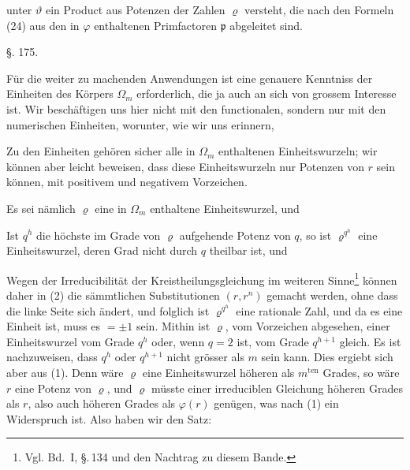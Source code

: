 unter $\vartheta$ ein Product aus Potenzen der Zahlen $\varrho$ versteht, die
nach den Formeln (24) aus den in $\varphi$ enthaltenen Primfactoren $\mathfrak{p}$
abgeleitet sind.

\begin{center}
§. 175.

\end{center}

Für die weiter zu machenden Anwendungen ist eine genauere
Kenntniss der Einheiten des Körpers $\Omega_m$ erforderlich, die ja
auch an sich von grossem Interesse ist. Wir beschäftigen uns
hier nicht mit den functionalen, sondern nur mit den numerischen
Einheiten, worunter, wie wir uns erinnern, 

Zu den Einheiten gehören sicher alle in $\Omega_m$ enthaltenen
Einheitswurzeln; wir können aber leicht beweisen, dass diese
Einheitswurzeln nur Potenzen von $r$ sein können, mit positivem
und negativem Vorzeichen.

Es sei nämlich $\varrho$ eine in $\Omega_m$ enthaltene Einheitswurzel, und

Ist $q^h$ die höchste im Grade von $\varrho$ aufgehende Potenz von $q$,
so ist $\varrho^{q^h}$ eine Einheitswurzel, deren Grad nicht durch $q$ theilbar
ist, und

Wegen der Irreducibilität der Kreistheilungsgleichung im
weiteren Sinne\footnote{Vgl. Bd.~I, §.\,134 und den Nachtrag zu diesem Bande.} können daher in (2) die sämmtlichen Substitutionen
 $(r, r^n)$ gemacht werden, ohne dass die linke Seite sich
ändert, und folglich ist $\varrho^{q^h}$ eine rationale Zahl, und da es eine
Einheit ist, muss es $= \pm 1$ sein. Mithin ist $\varrho$, vom Vorzeichen
abgesehen, einer Einheitswurzel vom Grade $q^h$ oder, wenn $q = 2$
ist, vom Grade $q^{h+1}$ gleich. Es ist nachzuweisen, dass $q^h$ oder
$q^{h+1}$ nicht grösser als $m$ sein kann. Dies ergiebt sich aber
aus (1). Denn wäre $\varrho$ eine Einheitswurzel höheren als $m^{\text{ten}}$
Grades, so wäre $r$ eine Potenz von $\varrho$, und $\varrho$ müsste einer irreduciblen
 Gleichung höheren Grades als $r$, also auch höheren
Grades als $\varphi(r)$ genügen, was nach (1) ein Widerspruch ist. Also
haben wir den Satz:
